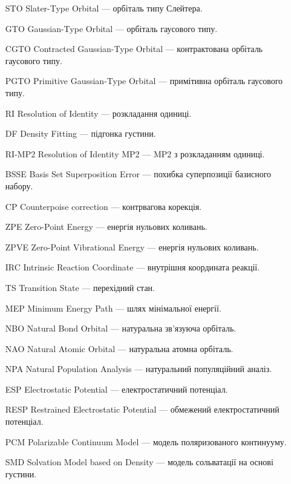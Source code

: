 \begin{enumerate}[
    leftmargin=10em,
    font=\bfseries,   %
    labelindent=5em,%
    leftmargin=*,     %
]
    \item[STO] Slater-Type Orbital --- орбіталь типу Слейтера.
    \item[GTO] Gaussian-Type Orbital --- орбіталь гаусового типу.
    \item[CGTO] Contracted Gaussian-Type Orbital --- контрактована орбіталь гаусового типу.
    \item[PGTO] Primitive Gaussian-Type Orbital --- примітивна орбіталь гаусового типу.

    \item[RI] Resolution of Identity --- розкладання одиниці.
    \item[DF] Density Fitting --- підгонка густини.
    \item[RI-MP2] Resolution of Identity MP2 --- MP2 з розкладанням одиниці.

    \item[BSSE] Basis Set Superposition Error --- похибка суперпозиції базисного набору.
    \item[CP] Counterpoise correction --- контрвагова корекція.

    \item[ZPE] Zero-Point Energy --- енергія нульових коливань.
    \item[ZPVE] Zero-Point Vibrational Energy --- енергія нульових коливань.

    \item[IRC] Intrinsic Reaction Coordinate --- внутрішня координата реакції.
    \item[TS] Transition State --- перехідний стан.
    \item[MEP] Minimum Energy Path --- шлях мінімальної енергії.

    \item[NBO] Natural Bond Orbital --- натуральна зв'язуюча орбіталь.
    \item[NAO] Natural Atomic Orbital --- натуральна атомна орбіталь.
    \item[NPA] Natural Population Analysis --- натуральний популяційний аналіз.

    \item[ESP] Electrostatic Potential --- електростатичний потенціал.
    \item[RESP] Restrained Electrostatic Potential --- обмежений електростатичний потенціал.

    \item[PCM] Polarizable Continuum Model --- модель поляризованого континууму.
    \item[SMD] Solvation Model based on Density --- модель сольватації на основі густини.


\end{enumerate}
